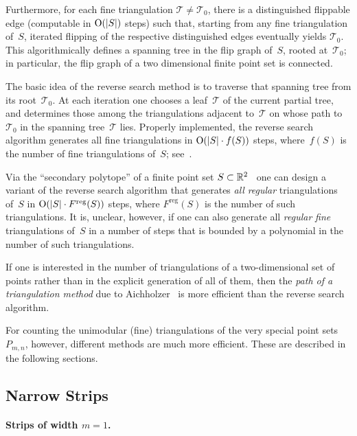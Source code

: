 Furthermore, for each fine triangulation
$\mathcal{T}\not=\mathcal{T}_0$, there is a distinguished flippable
edge
(computable in $\mbox{O}({|S|})$ steps) such that, starting from any fine
triangulation of~$S$, iterated flipping of the respective
distinguished edges eventually yields $\mathcal{T}_0$.  This
algorithmically defines a spanning tree in the flip graph of~$S$,
rooted at~$\mathcal{T}_0$; in particular, the flip graph of a two
dimensional finite point set is connected.

The basic idea of the reverse search method is to traverse that
spanning tree from its root~$\mathcal{T}_0$. At each iteration one
chooses a leaf~$\mathcal{T}$ of the current partial tree, and
determines those among the triangulations adjacent to~$\mathcal{T}$ on
whose path to~$\mathcal{T}_0$ in the spanning tree~$\mathcal{T}$ lies.
Properly implemented, the reverse search algorithm generates all fine
triangulations in $\mbox{O}({|S|\cdot f(S)})$ steps, where~$f(S)$ is the
number of fine triangulations of~$S$; see~\cite{AvisFukuda}.

Via the ``secondary polytope'' of a finite point set
$S\subset\mathbb{R}^2$~\cite{GKZ}  
one can design a variant of the reverse
search algorithm that generates \emph{all} \emph{regular}
triangulations of~$S$ in $\mbox{O}({|S|\cdot F^{\text{reg}}(S)})$ steps,
where $F^{\text{reg}}(S)$ is the number of such triangulations. It is,
unclear, however, if one can also generate all \emph{regular}
\emph{fine} triangulations of~$S$ in a number of steps that is bounded
by a polynomial in the number of such triangulations.
 
If one is interested in the number of triangulations of a
two-dimensional set of points rather than in the explicit generation
of all of them, then the \emph{path of a triangulation method} due to
Aichholzer~\cite{Aichholzer-path} is more efficient than the reverse
search algorithm.

For counting the unimodular (fine) triangulations of the very special
point sets $P_{m,n}$, however, different methods are much more
efficient. These are described in the following sections.


\subsection{Narrow Strips}
\label{subsec:narrow}

\paragraph{Strips of width \boldmath$m=1$. }

